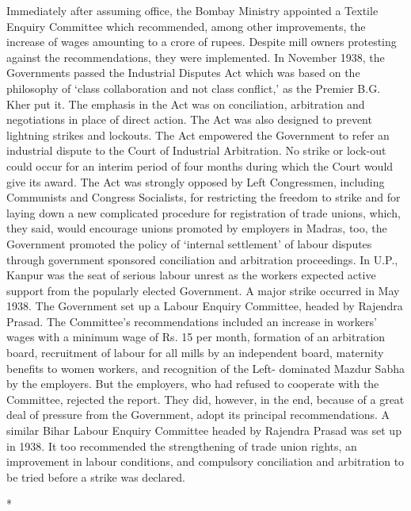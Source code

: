 Immediately after assuming office, the Bombay Ministry appointed a Textile Enquiry Committee which recommended, among other improvements, the increase of wages amounting to a crore of rupees. Despite mill owners protesting against the recommendations, they were implemented. In November 1938, the Governments passed the Industrial Disputes Act which was based on the philosophy of `class collaboration and not class conflict,' as the Premier B.G. Kher put it. The emphasis in the Act was on conciliation, arbitration and negotiations in place of direct action. The Act was also designed to prevent lightning strikes and lockouts. The Act empowered the Government to refer an industrial dispute to the Court of Industrial Arbitration. No strike or lock-out could occur for an interim period of four months during which the Court would give its award. The Act was strongly opposed by Left Congressmen, including Communists and Congress Socialists, for restricting the freedom to strike and for laying down a new complicated procedure for registration of trade unions, which, they said, would encourage unions promoted by employers in Madras, too, the Government promoted the policy of `internal settlement' of labour disputes through government sponsored conciliation and arbitration proceedings. In U.P., Kanpur was the seat of serious labour unrest as the workers expected active support from the popularly elected Government. A major strike occurred in May 1938. The Government set up a Labour Enquiry Committee, headed by Rajendra Prasad. The Committee's recommendations included an increase in workers' wages with a minimum wage of Rs. 15 per month, formation of an arbitration board, recruitment of labour for all mills by an independent board, maternity benefits to women workers, and recognition of the Left- dominated Mazdur Sabha by the employers. But the employers, who had refused to cooperate with the Committee, rejected the report. They did, however, in the end, because of a great deal of pressure from the Government, adopt its principal recommendations. A similar Bihar Labour Enquiry Committee headed by Rajendra Prasad was set up in 1938. It too recommended the strengthening of trade union rights, an improvement in labour conditions, and compulsory conciliation and arbitration to be tried before a strike was declared.

\begin{center}*\end{center}

\paragraph*{}


